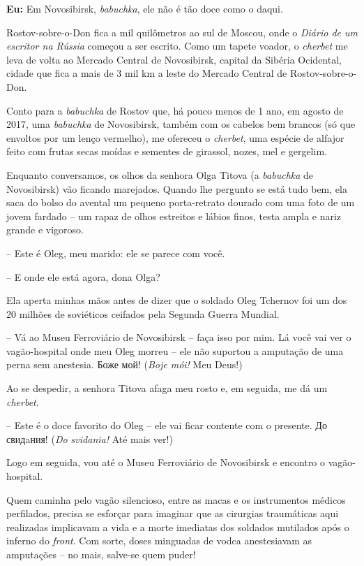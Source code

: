 \textbf{Eu:} Em Novosibirsk, \emph{babuchka}, ele não é tão doce como o
daqui.

Rostov-sobre-o-Don fica a mil quilômetros ao sul de Moscou, onde o
\emph{Diário de um escritor na Rússia} começou a ser escrito. Como um
tapete voador, o \emph{cherbet} me leva de volta ao Mercado Central de
Novosibirsk, capital da Sibéria Ocidental, cidade que fica a mais de 3
mil km a leste do Mercado Central de Rostov-sobre-o-Don.

Conto para a \emph{babuchka} de Rostov que, há pouco menos de 1 ano, em
agosto de 2017, uma \emph{babuchka} de Novosibirsk, também com os
cabelos bem brancos (só que envoltos por um lenço vermelho), me ofereceu
o \emph{cherbet}, uma espécie de alfajor feito com frutas secas moídas e
sementes de girassol, nozes, mel e gergelim.

Enquanto conversamos, os olhos da senhora Olga Titova (a \emph{babuchka}
de Novosibirsk) vão ficando marejados. Quando lhe pergunto se está tudo
bem, ela saca do bolso do avental um pequeno porta-retrato dourado com
uma foto de um jovem fardado -- um rapaz de olhos estreitos e lábios
finos, testa ampla e nariz grande e vigoroso.

-- Este é Oleg, meu marido: ele se parece com você.

-- E onde ele está agora, dona Olga?

Ela aperta minhas mãos antes de dizer que o soldado Oleg Tchernov foi um
dos 20 milhões de soviéticos ceifados pela Segunda Guerra Mundial.

-- Vá ao Museu Ferroviário de Novosibirsk -- faça isso por mim. Lá você
vai ver o vagão-hospital onde meu Oleg morreu -- ele não suportou a
amputação de uma perna sem anestesia. Боже мой! (\emph{Boje mói!} Meu
Deus!)

Ao se despedir, a senhora Titova afaga meu rosto e, em seguida, me dá um
\emph{cherbet}.

-- Este é o doce favorito do Oleg -- ele vai ficar contente com o
presente.
\href{https://www.google.com.br/url?sa=t\&rct=j\&q=\&esrc=s\&source=web\&cd=3\&cad=rja\&uact=8\&ved=0ahUKEwjh8smEuafWAhWBgJAKHX6tCwkQFgg3MAI\&url=http\%3A\%2F\%2Frussmus.net\%2Fsong\%2F2688\&usg=AFQjCNFSEZNtwU85ST4Ps_ljw4fJNbHc0w}{Д}о
свидaния! (\emph{Do svidania!} Até mais ver!)

Logo em seguida, vou até o Museu Ferroviário de Novosibirsk e encontro o
vagão-hospital.

Quem caminha pelo vagão silencioso, entre as macas e os instrumentos
médicos perfilados, precisa se esforçar para imaginar que as cirurgias
traumáticas aqui realizadas implicavam a vida e a morte imediatas dos
soldados mutilados após o inferno do \emph{front}. Com sorte, doses
minguadas de vodca anestesiavam as amputações -- no mais, salve-se quem
puder!

